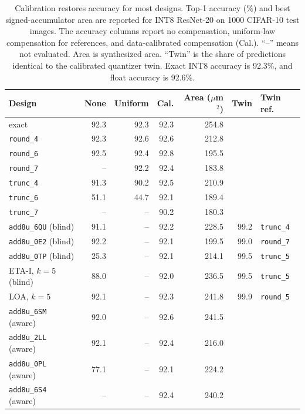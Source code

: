 \documentclass[preprint,12pt,numbers]{elsarticle}
\theoremstyle{definition}
\begin{document}
\begin{table}[t]
\centering
\caption{Calibration restores accuracy for most designs. Top-1
accuracy (\%) and best signed-accumulator area are reported for
INT8 ResNet-20 on 1000 CIFAR-10 test images. The accuracy columns report no
compensation, uniform-law compensation for references, and data-calibrated
compensation (Cal.). ``--'' means not evaluated. Area is synthesized area.
``Twin'' is the share of predictions identical to the
calibrated quantizer twin. Exact INT8 accuracy is 92.3\%, and float accuracy
is 92.6\%.}
\label{tab:cnn}
\footnotesize
\setlength{\tabcolsep}{4pt}
\begin{tabular}{lrrrrrl}
\toprule
Design & None & Uniform & Cal. & Area ($\mu$m$^2$) & Twin & Twin ref. \\
\midrule
exact            & 92.3 & 92.3 & 92.3 & 254.8 &  & \\
\texttt{round\_4} & 92.3 & 92.6 & 92.6 & 212.8 &  & \\
\texttt{round\_6} & 92.5 & 92.4 & 92.8 & 195.5 &  & \\
\texttt{round\_7} & --   & 92.2 & 92.4 & 183.8 &  & \\
\texttt{trunc\_4} & 91.3 & 90.2 & 92.5 & 210.9 &  & \\
\texttt{trunc\_6} & 51.1 & 44.7 & 92.1 & 189.4 &  & \\
\texttt{trunc\_7} & --   & --   & 90.2 & 180.3 &  & \\
\midrule
\texttt{add8u\_6QU} (blind)  & 91.1 & -- & 92.2 & 228.5 & 99.2 & \texttt{trunc\_4}\\
\texttt{add8u\_0E2} (blind)  & 92.2 & -- & 92.1 & 199.5 & 99.0 & \texttt{round\_7}\\
\texttt{add8u\_0TP} (blind)  & 25.3 & -- & 92.1 & 214.1 & 99.5 & \texttt{trunc\_5}\\
ETA-I, $k{=}5$ (blind)       & 88.0 & -- & 92.0 & 236.5 & 99.5 & \texttt{trunc\_5}\\
LOA, $k{=}5$                 & 92.1 & -- & 92.3 & 241.8 & 99.9 & \texttt{round\_5}\\
\texttt{add8u\_6SM} (aware)  & 92.0 & -- & 92.6 & 241.5 & & \\
\texttt{add8u\_2LL} (aware)  & 92.1 & -- & 92.4 & 216.0 & & \\
\texttt{add8u\_0PL} (aware)  & 77.1 & -- & 92.1 & 224.2 & & \\
\texttt{add8u\_6S4} (aware)  & --   & -- & 92.4 & 240.2 & & \\
\bottomrule
\end{tabular}
\end{table}
\end{document}
